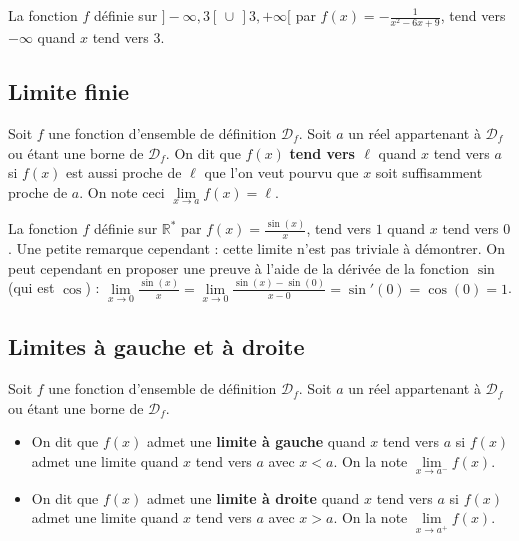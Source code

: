 	\begin{tip}[Exemple]
		La fonction $f$ définie sur $]-\infty, 3[ \, \cup \, ]3, +\infty[$ par $f(x) = -\frac{1}{x^2-6x+9}$, tend vers $-\infty$ quand $x$ tend vers $3$.
	\end{tip}

	\subsection{Limite finie}

	\begin{formula}[Définition]
		Soit $f$ une fonction d'ensemble de définition $\mathcal{D}_f$. Soit $a$ un réel appartenant à $\mathcal{D}_f$ ou étant une borne de $\mathcal{D}_f$.
		\newpar
		On dit que $f(x)$ \textbf{tend vers $\ell$} quand $x$ tend vers $a$ si $f(x)$ est aussi proche de $\ell$ que l'on veut pourvu que $x$ soit suffisamment proche de $a$.
		\newpar
		On note ceci $\lim\limits_{x \rightarrow a} f(x) = \ell$.
	\end{formula}

	\begin{tip}[Exemple]
		La fonction $f$ définie sur $\mathbb{R}^*$ par $f(x) = \frac{\sin(x)}{x}$, tend vers $1$ quand $x$ tend vers $0$.
		Une petite remarque cependant : cette limite n'est pas triviale à démontrer. On peut cependant en proposer une preuve à l'aide de la dérivée de la fonction $\sin$ (qui est $\cos$) : $\lim\limits_{x \rightarrow 0} \frac{\sin(x)}{x} = \lim\limits_{x \rightarrow 0} \frac{\sin(x) - \sin(0)}{x - 0} = \sin'(0) = \cos(0) = 1$.
	\end{tip}

	\subsection{Limites à gauche et à droite}

	\begin{formula}[Définition]
		Soit $f$ une fonction d'ensemble de définition $\mathcal{D}_f$. Soit $a$ un réel appartenant à $\mathcal{D}_f$ ou étant une borne de $\mathcal{D}_f$.
		\begin{itemize}
			\item On dit que $f(x)$ admet une \textbf{limite à gauche} quand $x$ tend vers $a$ si $f(x)$ admet une limite quand $x$ tend vers $a$ avec $x < a$. On la note $\lim\limits_{x \rightarrow a^-} f(x)$.
			\item On dit que $f(x)$ admet une \textbf{limite à droite} quand $x$ tend vers $a$ si $f(x)$ admet une limite quand $x$ tend vers $a$ avec $x > a$. On la note $\lim\limits_{x \rightarrow a^+} f(x)$.
		\end{itemize}
	\end{formula}

